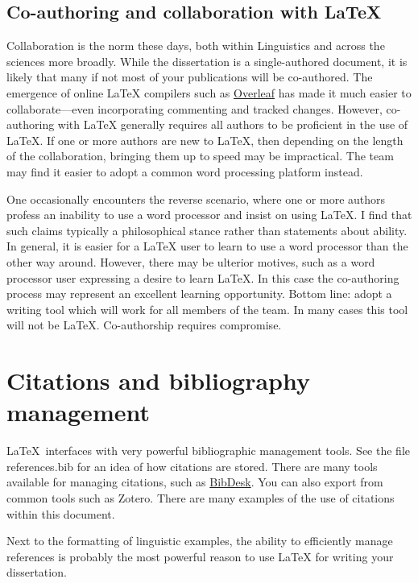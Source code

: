 \subsection{Co-authoring and collaboration with \LaTeX}
Collaboration is the norm these days, both within Linguistics and across the sciences more broadly.
While the dissertation is a single-authored document, it is likely that many if not most of your publications will be co-authored. 
The emergence of online {\LaTeX} compilers such as \href{http:overleaf.com}{Overleaf} has made it much easier to collaborate---even incorporating commenting and tracked changes. 
However, co-authoring with {\LaTeX} generally requires all authors to be proficient in the use of {\LaTeX}.  If one or more authors are new to {\LaTeX}, then depending on the length of the collaboration, bringing them up to speed may be impractical. The team may find it easier to adopt a common word processing platform instead.

One occasionally encounters the reverse scenario, where one or more authors profess an inability to use a word processor and insist on using \LaTeX. I find that such claims typically a philosophical stance rather than statements about ability. In general, it is easier for a {\LaTeX} user to learn to use a word processor than the other way around. However, there may be ulterior motives, such as a word processor user expressing a desire to learn \LaTeX. In this case the co-authoring process may represent an excellent learning opportunity.  Bottom line: adopt a writing tool which will work for all members of the team. In many cases this tool will not be \LaTeX. Co-authorship requires compromise. 


\section{Citations and bibliography management}\label{sec:citations}
\LaTeX\ interfaces with very powerful bibliographic management tools. See the file references.bib for an idea of how citations are stored. There are many tools available for managing citations, such as \href{https://bibdesk.sourceforge.io/}{BibDesk}. You can also export from common tools such as Zotero.  There are many examples of the use of citations within this document.

Next to the formatting of linguistic examples, the ability to efficiently manage references is probably the most powerful reason to use {\LaTeX} for writing your dissertation. 